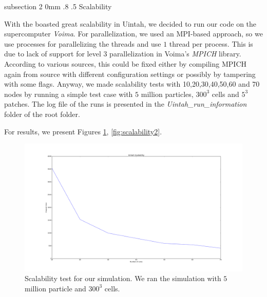 \documentclass[notitlepage, 12pt]{article}
\makeatletter
\renewcommand{\subsection}{\@startsection    %
        {subsection}
        {2}
        {0mm}
        {.8\baselineskip}
        {.5\baselineskip}
        {\bfseries\normalsize}}
\makeatother
\begin{document}
\subsection{Scalability}

With the boasted great scalability in Uintah, we decided to run our code on the supercomputer \emph{Voima}. For parallelization, we used an MPI-based 
approach, so we use processes for parallelizing the threads and use $1$ thread per process. This is due to lack of support for level $3$ parallelization in 
Voima's \emph{MPICH} library. According to various sources, this could be fixed either by compiling MPICH again from source with different configuration 
settings or possibly by tampering with some flags. Anyway, we made scalability tests with 10,20,30,40,50,60 and 70 nodes by running a simple test 
case with $5$ million particles, $300^3$ cells and $5^3$ patches. The log file of the runs is presented in the \emph{Uintah\_run\_information} 
folder of the root folder. 

For results, we present Figures \ref{fig:scalability1}, \ref{fig:scalability2}.

\begin{figure}[H]
\centering
\includegraphics[width=\textwidth]{Uintah/scalability.png}
\caption{Scalability test for our simulation. We ran the simulation with $5$ million particle and $300^3$ cells.}
\label{fig:scalability1}
\end{figure}
\end{document}
